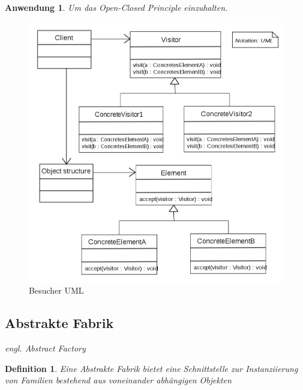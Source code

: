 \documentclass[a4paper]{article}
\theoremstyle{break}
\newtheorem{defi}{Definition}[section]
\newtheorem{why}{Anwendung}[section]
\begin{document}
\begin{why}
	Um das Open-Closed Principle einzuhalten.
\end{why}
\begin{figure}[H]
	\centering
	\includegraphics[width=\textwidth]{../uml/VisitorPattern.png}
	\caption{Besucher UML}
	\label{fig3}
\end{figure}




\newpage
\subsection{Abstrakte Fabrik}

\textit{engl. Abstract Factory}

\begin{defi}
	Eine Abstrakte Fabrik bietet eine Schnittstelle zur Instanziierung von Familien bestehend aus voneinander abhängigen Objekten
\end{defi}
\end{document}
